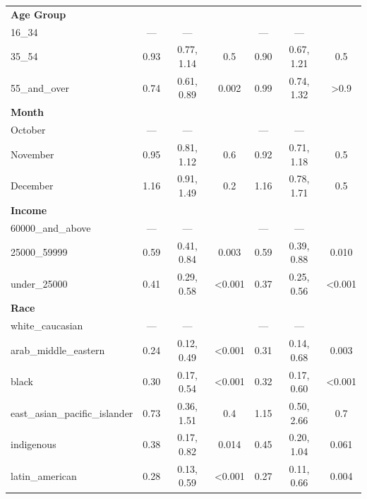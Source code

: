 \documentclass[
  letterpaper,
  DIV=11,
  numbers=noendperiod]{scrartcl}
\begin{document}
\begin{longtable}{lcccccc}
\endfoot
\bottomrule
\endlastfoot
\textbf{Age Group} &  &  &  &  &  & \\
\hspace{1em}16\_34 & — & — &  & — & — & \\
\hspace{1em}35\_54 & 0.93 & 0.77, 1.14 & 0.5 & 0.90 & 0.67, 1.21 & 0.5\\
\hspace{1em}55\_and\_over & 0.74 & 0.61, 0.89 & 0.002 & 0.99 & 0.74, 1.32 & >0.9\\
\textbf{Month} &  &  &  &  &  & \\
\hspace{1em}October & — & — &  & — & — & \\
\hspace{1em}November & 0.95 & 0.81, 1.12 & 0.6 & 0.92 & 0.71, 1.18 & 0.5\\
\hspace{1em}December & 1.16 & 0.91, 1.49 & 0.2 & 1.16 & 0.78, 1.71 & 0.5\\
\textbf{Income} &  &  &  &  &  & \\
\hspace{1em}60000\_and\_above & — & — &  & — & — & \\
\hspace{1em}25000\_59999 & 0.59 & 0.41, 0.84 & 0.003 & 0.59 & 0.39, 0.88 & 0.010\\
\hspace{1em}under\_25000 & 0.41 & 0.29, 0.58 & <0.001 & 0.37 & 0.25, 0.56 & <0.001\\
\textbf{Race} &  &  &  &  &  & \\
\hspace{1em}white\_caucasian & — & — &  & — & — & \\
\hspace{1em}arab\_middle\_eastern & 0.24 & 0.12, 0.49 & <0.001 & 0.31 & 0.14, 0.68 & 0.003\\
\hspace{1em}black & 0.30 & 0.17, 0.54 & <0.001 & 0.32 & 0.17, 0.60 & <0.001\\
\hspace{1em}east\_asian\_pacific\_islander & 0.73 & 0.36, 1.51 & 0.4 & 1.15 & 0.50, 2.66 & 0.7\\
\hspace{1em}indigenous & 0.38 & 0.17, 0.82 & 0.014 & 0.45 & 0.20, 1.04 & 0.061\\
\hspace{1em}latin\_american & 0.28 & 0.13, 0.59 & <0.001 & 0.27 & 0.11, 0.66 & 0.004\\

\end{longtable}
\end{document}
